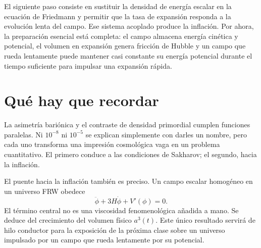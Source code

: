 El siguiente paso consiste en sustituir la densidad de energía escalar en la ecuación de Friedmann y permitir que la tasa de expansión responda a la evolución lenta del campo. Ese sistema acoplado produce la inflación. Por ahora, la preparación esencial está completa: el campo almacena energía cinética y potencial, el volumen en expansión genera fricción de Hubble y un campo que rueda lentamente puede mantener casi constante su energía potencial durante el tiempo suficiente para impulsar una expansión rápida.

\section{Qué hay que recordar}

La asimetría bariónica y el contraste de densidad primordial cumplen funciones paralelas. Ni \(10^{-8}\) ni \(10^{-5}\) se explican simplemente con darles un nombre, pero cada uno transforma una impresión cosmológica vaga en un problema cuantitativo. El primero conduce a las condiciones de Sakharov; el segundo, hacia la inflación.

El puente hacia la inflación también es preciso. Un campo escalar homogéneo en un universo FRW obedece
\[
\ddot\phi+3H\dot\phi+V'(\phi)=0.
\]
El término central no es una viscosidad fenomenológica añadida a mano. Se deduce del crecimiento del volumen físico \(a^3(t)\). Este único resultado servirá de hilo conductor para la exposición de la próxima clase sobre un universo impulsado por un campo que rueda lentamente por su potencial.
